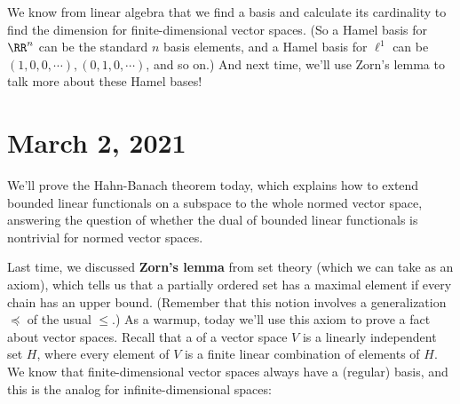 We know from linear algebra that we find a basis and calculate its cardinality to find the dimension for finite-dimensional vector spaces. (So a Hamel basis for $\RR^n$ can be the standard $n$ basis elements, and a Hamel basis for $\ell^1$ can be $(1, 0, 0, \cdots), (0, 1, 0, \cdots)$, and so on.) And next time, we'll use Zorn's lemma to talk more about these Hamel bases!


\pagebreak\section*{March 2, 2021}

We'll prove the Hahn-Banach theorem today, which explains how to extend bounded linear functionals on a subspace to the whole normed vector space, answering the question of whether the dual of bounded linear functionals is nontrivial for normed vector spaces. 

Last time, we discussed \textbf{Zorn's lemma} from set theory (which we can take as an axiom), which tells us that a partially ordered set has a maximal element if every chain has an upper bound. (Remember that this notion involves a generalization $\preceq$ of the usual $\le$.) As a warmup, today we'll use this axiom to prove a fact about vector spaces. Recall that a  of a vector space $V$ is a linearly independent set $H$, where every element of $V$ is a finite linear combination of elements of $H$. We know that finite-dimensional vector spaces always have a (regular) basis, and this is the analog for infinite-dimensional spaces:


